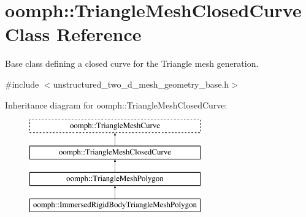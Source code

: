 \hypertarget{classoomph_1_1TriangleMeshClosedCurve}{}\section{oomph\+:\+:Triangle\+Mesh\+Closed\+Curve Class Reference}
\label{classoomph_1_1TriangleMeshClosedCurve}


Base class defining a closed curve for the Triangle mesh generation.  




{\ttfamily \#include $<$unstructured\+\_\+two\+\_\+d\+\_\+mesh\+\_\+geometry\+\_\+base.\+h$>$}

Inheritance diagram for oomph\+:\+:Triangle\+Mesh\+Closed\+Curve\+:\begin{figure}[H]
\begin{center}
\leavevmode
\includegraphics[height=4.000000cm]{classoomph_1_1TriangleMeshClosedCurve}
\end{center}
\end{figure}
